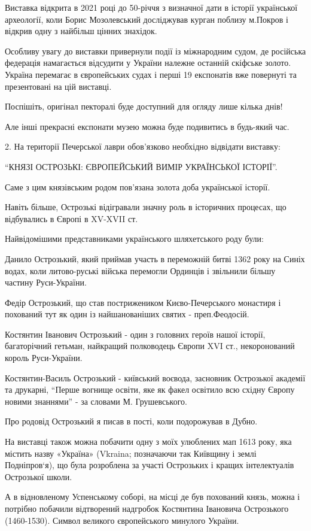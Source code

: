 Виставка відкрита в 2021 році до 50-річчя з визначної дати в історії
української археології, коли Борис Мозолевський досліджував курган поблизу
м.Покров і відкрив одну з найбільш цінних знахідок.

Особливу увагу до виставки привернули події із міжнародним судом, де російська
федерація намагається відсудити у України належне останній скіфське золото.
Україна перемагає в європейських судах і перші 19 експонатів вже повернуті та
презентовані на цій виставці.

Поспішіть, оригінал пекторалі буде доступний для огляду лише кілька днів! 

Але інші прекрасні експонати музею можна буде подивитись в будь-який час.

2. На території Печерської лаври обов’язково необхідно відвідати виставку:

\enquote{КНЯЗІ ОСТРОЗЬКІ: ЄВРОПЕЙСЬКИЙ ВИМІР УКРАЇНСЬКОЇ ІСТОРІЇ}.

Саме з цим князівським родом пов’язана золота доба української історії. 

Навіть більше, Острозькі відігравали значну роль в історичних процесах, що
відбувались в Європі в XV-XVII ст. 

Найвідомішими представниками українського шляхетського роду були:

Данило Острозький, який приймав участь в переможній битві 1362 року на Синіх
водах, коли литово-руські війська перемогли Ординців і звільнили більшу частину
Руси-України. 

Федір Острозький, що став пострижеником Києво-Печерського монастиря і похований
тут як один із найшанованіших святих - преп.Феодосій.

Костянтин Іванович Острозький - один з головних героїв нашої історії,
багаторічний гетьман, найкращий полководець Європи XVI ст., некоронований
король Руси-України.

Костянтин-Василь Острозький - київський воєвода, засновник Острозької академії
та друкарні, \enquote{Перше вогнище освіти, яке як факел освітило всю східну
Європу новими знаннями} - за словами М. Грушевського.  

Про родовід Острозький я писав в пості, коли подорожував в Дубно.

На виставці також можна побачити одну з моїх улюблених мап 1613 року, яка
містить назву «Україна» (Vkraina; позначаючи так Київщину і землі Подніпров‘я),
що була розроблена за участі Острозьких і кращих інтелектуалів Острозької
школи.

А в відновленому Успенському соборі, на місці де був похований князь, можна і
потрібно побачили відтворений надгробок Костянтина Івановича Острозького
(1460-1530). Символ великого європейського минулого України.

